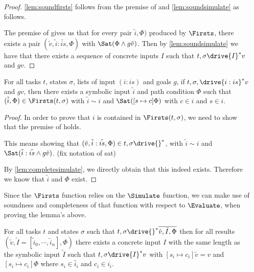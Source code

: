 \begin{proof}
  \cref{lem:soundfirsts} follows from the premise of  and \cref{lem:soundsimulate} as follows.

  The premise of  gives us that for every pair $\tilde{i},\Phi)$ produced by $\Firsts$,
  there exists a pair $(\tilde{v},\tilde{i}:\tilde{is},\Phi)$ with $\Sat(\Phi\land g \tilde{v})$.
  Then by \cref{lem:soundsimulate} we have that there exists a sequence of concrete inputs $I$ such that
  $t,\sigma\drive{I}^*v$ and $g v$.
\end{proof}

\begin{lemma}
  \label{lem:completefirsts}
  For all tasks $t$, states $\sigma$, lists of input $(i:is)$ and goals $g$,
  if $t,\sigma,\drive{i:is}^*v$ and $g v$, then there exists a symbolic input $\tilde{i}$ and path condition $\Phi$
  such that $(\tilde{i},\Phi)\in\Firsts(t,\sigma)$ with $\tilde{i}\sim i$ and $\Sat([s\mapsto c]\Phi)$ with $c\in i$ and $s\in i$.
\end{lemma}

\begin{proof}
  In order to prove that $i$ is contained in $\Firsts(t,\sigma)$, we need to show that the premise of  holds.

  This means showing that $(\tilde{v},\tilde{i}:\tilde{is},\Phi)\in t,\sigma\drive{}^*$, with $\tilde{i}\sim i$ and $\Sat(\tilde{i}:\tilde{is}\land g\tilde{v})$. (fix notation of sat)

  By \cref{lem:completesimulate}, we directly obtain that this indeed exists. Therefore we know that $\tilde{i}$ and $\Phi$ exist.
\end{proof}


Since the $\Firsts$ function relies on the $\Simulate$ function, we can make use of soundness and completeness of that function with respect to $\Evaluate$, when proving the lemma's above.

\begin{lemma}
  \label{lem:soundsimulate}
  For all tasks $t$ and states $\sigma$
  such that $t,\sigma\drive{}^*\overline{\tilde{v},\tilde{I},\Phi}$
  then for all results $(\tilde{v},\tilde{I}=[\tilde{i}_0,\cdots,\tilde{i}_n],\Phi)$
  there exists a concrete input $I$ with the same length as the symbolic input $\tilde{I}$
  such that $t,\sigma\drive{I}^*v$
  with $[s_i\mapsto c_i]\tilde{v}=v$ and $[s_i\mapsto c_i]\Phi$
  where $s_i\in\tilde{i_i}$ and $c_i\in i_i$.
\end{lemma}

